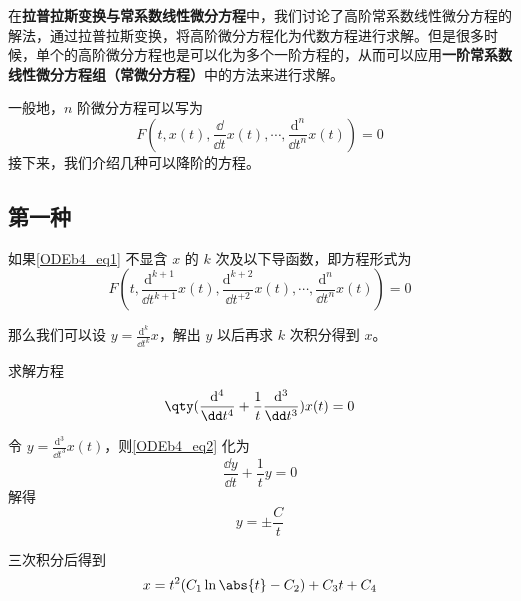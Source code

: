 

在\textbf{拉普拉斯变换与常系数线性微分方程}中，我们讨论了高阶常系数线性微分方程的解法，通过拉普拉斯变换，将高阶微分方程化为代数方程进行求解。但是很多时候，单个的高阶微分方程也是可以化为多个一阶方程的，从而可以应用\textbf{一阶常系数线性微分方程组（常微分方程）}中的方法来进行求解。

一般地，$n$ 阶微分方程可以写为
\begin{equation}\label{ODEb4_eq1}
F(t, x(t), \frac{\dd}{\dd t}x(t), \cdots, \frac{\mathrm{d}^n}{\dd t^n}x(t))=0
\end{equation}
接下来，我们介绍几种可以降阶的方程。

\subsection{第一种}

如果\autoref{ODEb4_eq1} 不显含 $x$ 的 $k$ 次及以下导函数，即方程形式为
\begin{equation}
F(t, \frac{\mathrm{d}^{k+1}}{\dd t^{k+1}}x(t), \frac{\mathrm{d}^{k+2}}{\dd t^{+2}}x(t), \cdots, \frac{\mathrm{d}^n}{\dd t^n}x(t))=0
\end{equation}

那么我们可以设 $y=\frac{\mathrm{d}^k}{\dd t^k}x$，解出 $y$ 以后再求 $k$ 次积分得到 $x$。


\begin{example}{}
求解方程
\begin{equation}\label{ODEb4_eq2}
\qty(
    \frac{\mathrm{d}^4}{\dd t^4}+\frac{1}{t}\frac{\mathrm{d}^3}{\dd t^3}
    )
    x(t)=0
\end{equation}

令 $y=\frac{\mathrm{d}^3}{\dd t^3}x(t)$，则\autoref{ODEb4_eq2} 化为
\begin{equation}
\frac{\dd y}{\dd t}+\frac{1}{t}y=0
\end{equation}
解得
\begin{equation}
y=\pm\frac{C}{t}
\end{equation}

三次积分后得到
\begin{equation}
x=t^2(C_1\ln\abs{t}-C_2)+C_3t+C_4
\end{equation}



\end{example}


